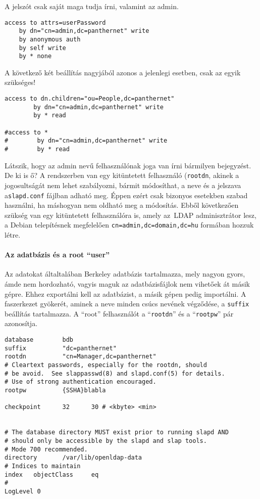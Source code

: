 A jelszót csak saját maga tudja írni, valamint az admin.

\begin{Verbatim}[frame=single]
access to attrs=userPassword
    by dn="cn=admin,dc=panthernet" write
    by anonymous auth
    by self write
    by * none
\end{Verbatim}    

A következő két beállítás nagyjából azonos a jelenlegi esetben, csak az egyik szükséges!

\begin{Verbatim}[frame=single]
access to dn.children="ou=People,dc=panthernet"
        by dn="cn=admin,dc=panthernet" write
        by * read

#access to *
#        by dn="cn=admin,dc=panthernet" write
#        by * read
\end{Verbatim}


Látszik, hogy az admin nevű felhasználónak joga van írni bármilyen bejegyzést. De ki is ő? A rendszerben van egy
kitüntetett felhasználó (\texttt{rootdn}, akinek a jogosultságát nem lehet szabályozni, bármit módosíthat, a
neve és a jelszava a\texttt{slapd.conf} fájlban adható meg. Éppen ezért csak bizonyos esetekben szabad használni, ha
máshogyan nem oldható meg a módosítás. Ebből következően szükség van egy kitüntetett felhasználóra is, amely az~LDAP
adminisztrátor lesz, a Debian telepítésnek megfelelően \texttt{cn=admin,dc=domain,dc=hu} formában hozzuk létre.


\paragraph{Az adatbázis és a root ``user''} Az adatokat általtalában Berkeley adatbázis tartalmazza, mely nagyon
gyors, ámde nem hordozható, vagyis maguk az adatbázisfájlok nem vihetőek át másik gépre. Ehhez exportálni kell az
adatbázist, a másik gépen pedig importálni. A faszerkezet gyökerét, aminek a neve minden csúcs nevének végződése, a
\texttt{suffix} beállítás tartalmazza. A ``root'' felhasználót a ``\texttt{rootdn}'' és a ``\texttt{rootpw}'' pár
azonosítja.

\begin{Verbatim}[frame=single]
database        bdb
suffix          "dc=panthernet"
rootdn          "cn=Manager,dc=panthernet"
# Cleartext passwords, especially for the rootdn, should
# be avoid.  See slappasswd(8) and slapd.conf(5) for details.
# Use of strong authentication encouraged.
rootpw          {SSHA}blabla

checkpoint      32      30 # <kbyte> <min>


# The database directory MUST exist prior to running slapd AND
# should only be accessible by the slapd and slap tools.
# Mode 700 recommended.
directory       /var/lib/openldap-data
# Indices to maintain
index   objectClass     eq
#
LogLevel 0
\end{Verbatim}


